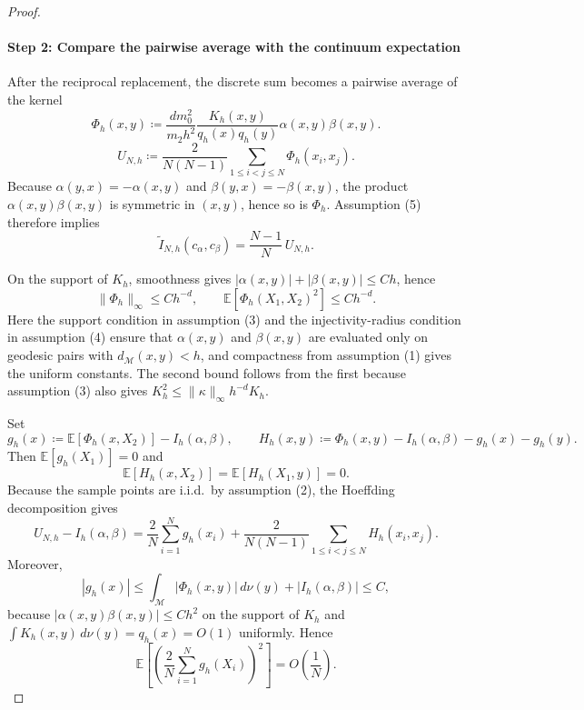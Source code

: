 \documentclass[10pt,a4paper]{amsart}
\newcommand{\mc}[1]{\mathcal{#1}}
\begin{document}
\begin{proof}
\paragraph{Step 2: Compare the pairwise average with the continuum expectation}
After the reciprocal replacement, the discrete sum becomes a pairwise average of the kernel
\begin{equation}
\label{eq:def-Phi-h}
\Phi_h(x,y)
\coloneq
\frac{dm_0^2}{m_2h^2}
\frac{K_h(x,y)}{q_h(x)q_h(y)}
\alpha(x,y)\beta(x,y).
\end{equation}
\begin{equation}
\label{eq:def-U-N-h}
U_{N,h}
\coloneq
\frac{2}{N(N-1)}
\sum_{1\le i<j\le N}\Phi_h(x_i,x_j).
\end{equation}
Because $\alpha(y,x)=-\alpha(x,y)$ and $\beta(y,x)=-\beta(x,y)$, the product $\alpha(x,y)\beta(x,y)$ is symmetric in $(x,y)$, hence so is $\Phi_h$. Assumption \textup{(5)} therefore implies
\begin{equation}
\label{eq:Itilde-vs-U}
\widetilde I_{N,h}(c_\alpha,c_\beta)
=
\frac{N-1}{N}\,U_{N,h}.
\end{equation}

On the support of $K_h$, smoothness gives $|\alpha(x,y)|+|\beta(x,y)|\le Ch$, hence
\begin{equation}
\label{eq:phi-moments}
\|\Phi_h\|_\infty\le C h^{-d},
\qquad
\mathbb E[\Phi_h(X_1,X_2)^2]\le C h^{-d}.
\end{equation}
Here the support condition in assumption \textup{(3)} and the injectivity-radius condition in assumption \textup{(4)} ensure that $\alpha(x,y)$ and $\beta(x,y)$ are evaluated only on geodesic pairs with $d_{\mc{M}}(x,y)<h$, and compactness from assumption \textup{(1)} gives the uniform constants. The second bound follows from the first because assumption \textup{(3)} also gives $K_h^2\le \|\kappa\|_\infty h^{-d}K_h$.

Set
\begin{equation}
g_h(x)\coloneq \mathbb E[\Phi_h(x,X_2)]-I_h(\alpha,\beta),
\qquad
H_h(x,y)\coloneq \Phi_h(x,y)-I_h(\alpha,\beta)-g_h(x)-g_h(y).
\end{equation}
Then $\mathbb E[g_h(X_1)]=0$ and
\begin{equation}
\mathbb E[H_h(x,X_2)]=\mathbb E[H_h(X_1,y)]=0.
\end{equation}
Because the sample points are i.i.d.\ by assumption \textup{(2)}, the Hoeffding decomposition gives
\begin{equation}
\label{eq:hoeffding}
U_{N,h}-I_h(\alpha,\beta)
=
\frac{2}{N}\sum_{i=1}^N g_h(x_i)
+
\frac{2}{N(N-1)}
\sum_{1\le i<j\le N} H_h(x_i,x_j).
\end{equation}
Moreover,
\begin{equation}
|g_h(x)|
\le
\int_{\mc{M}}|\Phi_h(x,y)|\,d\nu(y)+|I_h(\alpha,\beta)|
\le C,
\end{equation}
because $|\alpha(x,y)\beta(x,y)|\le Ch^2$ on the support of $K_h$ and $\int K_h(x,y)\,d\nu(y)=q_h(x)=O(1)$ uniformly. Hence
\begin{equation}
\label{eq:linear-part-variance}
\mathbb E\!\left[
\left(
\frac{2}{N}\sum_{i=1}^N g_h(X_i)
\right)^2
\right]
=
O\!\left(\frac{1}{N}\right).
\end{equation}


\end{proof}
\end{document}
